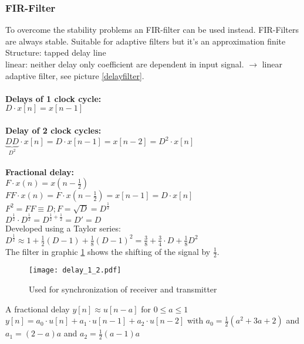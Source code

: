 \subsubsection{FIR-Filter}
To overcome the stability problems an FIR-filter can be used instead. FIR-Filters are always stable.
Suitable for adaptive filters but it's an approximation \pfeil finite \\
Structure: tapped delay line \\
linear: neither delay only coefficient are dependent in input signal. $\rightarrow$ linear adaptive filter, see picture \ref{delayfilter}.\\ \\

\textbf{Delays of 1 clock cycle:}\\
$D\cdot x[n] = x[n-1]$\\ \\
\textbf{Delay of 2 clock cycles:}\\
$\underbrace{DD}_{D^2}\cdot x[n] = D \cdot x[n-1] = x[n-2]= D^2\cdot x[n] $\\ \\

\textbf{Fractional delay:}\\
$F \cdot x(n) = x(n-\frac{1}{2})$\\
$FF \cdot x(n) = F \cdot x(n-\frac{1}{2}) = x[n-1] = D \cdot x[n]$\\
$F^2 = FF  	\equiv D ; F= \sqrt{D} = D^{\frac{1}{2}}$\\
$D^{\frac{1}{2}} \cdot D^{\frac{1}{2}} = D^{\frac{1}{2}+\frac{1}{2}} = D' =D$ \\
Developed using a Taylor series: $D^{\frac{1}{2}} \approx  1+\frac{1}{2}(D-1)+ \frac{1}{8}(D-1)^2 = \frac{3}{8}+\frac{3}{4}\cdot D + \frac{1}{8} D^2$\\
The filter in graphic \ref{delayfilter1_2} shows the shifting of the signal by $\frac{1}{2}$.
\begin{figure}[H]
	\centering
	\texttt{[image: delay\_1\_2.pdf]}
	\caption{Used for synchronization of receiver and transmitter}
	\label{delayfilter1_2} 
\end{figure}

A fractional delay $y[n] \approx u[n-a] $ for $0 \leq a \leq 1$ \\
$y[n] = a_0 \cdot u[n] + a_1 \cdot u[n-1] + a_2 \cdot u[n-2] $ with $ a_0 = \frac{1}{2} (a^2 + 3a + 2)$ and $a_1 = (2-a)a$ and $a_2= \frac{1}{2} (a-1) a $\\

